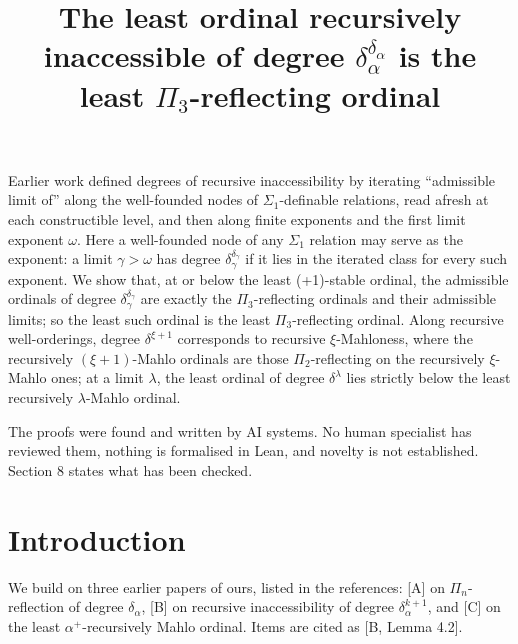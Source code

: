 \documentclass[11pt]{article}
\title{The least ordinal recursively inaccessible of degree $\delta_\alpha^{\delta_\alpha}$ is the least
$\Pi_3$-reflecting ordinal}
\date{\paperversion}
\begin{document}
\newcommand{\Ad}{\mathrm{Ad}}
\newcommand{\Lim}{\mathrm{Lim}\,}
\newcommand{\Lv}{\mathcal{L}}
\newcommand{\Cert}{\mathrm{Cert}}
\newcommand{\hgt}{\mathrm{ht}}
\newcommand{\WF}{\mathrm{WF}}
\newcommand{\Adm}{\mathrm{Adm}}
\newcommand{\rank}{\mathrm{rank}}
\newcommand{\PhiMh}{\Phi_{\Pi_2}}
\newcommand{\Nt}{\mathcal{N}}
\newcommand{\Fld}{\mathrm{Fld}}
\maketitle

\begin{frontnote} Earlier work defined degrees of recursive inaccessibility by iterating ``admissible
limit of'' along the well-founded nodes of $\Sigma_1$-definable relations, read afresh at each constructible level, and
then along finite exponents and the first limit exponent $\omega$. Here a well-founded node of any $\Sigma_1$ relation may serve as the
exponent: a limit $\gamma > \omega$ has degree $\delta_\gamma^{\delta_\gamma}$ if it lies in the iterated class for
every such exponent. We show that, at or below the least (+1)-stable ordinal, the admissible ordinals of degree $\delta_\gamma^{\delta_\gamma}$ are exactly the $\Pi_3$-reflecting ordinals and their admissible limits; so the least such ordinal is the least $\Pi_3$-reflecting ordinal. Along recursive well-orderings, degree $\delta^{\xi+1}$ corresponds to recursive
$\xi$-Mahloness, where the recursively $(\xi+1)$-Mahlo ordinals are those $\Pi_2$-reflecting on the recursively
$\xi$-Mahlo ones; at a limit $\lambda$, the least ordinal of degree $\delta^\lambda$ lies strictly below the least
recursively $\lambda$-Mahlo ordinal.
\end{frontnote}

\begin{frontnote} The proofs were found and written by AI systems. No human specialist has
reviewed them, nothing is formalised in Lean, and novelty is not established. Section 8 states what has been checked.
\end{frontnote}

\section{Introduction}

We build on three earlier papers of ours, listed in the references: [A] on $\Pi_n$-reflection of degree
$\delta_\alpha$, [B] on recursive inaccessibility of degree $\delta_\alpha^{k+1}$, and [C] on the least
$\alpha^+$-recursively Mahlo ordinal. Items are cited as [B, Lemma 4.2].
\end{document}
